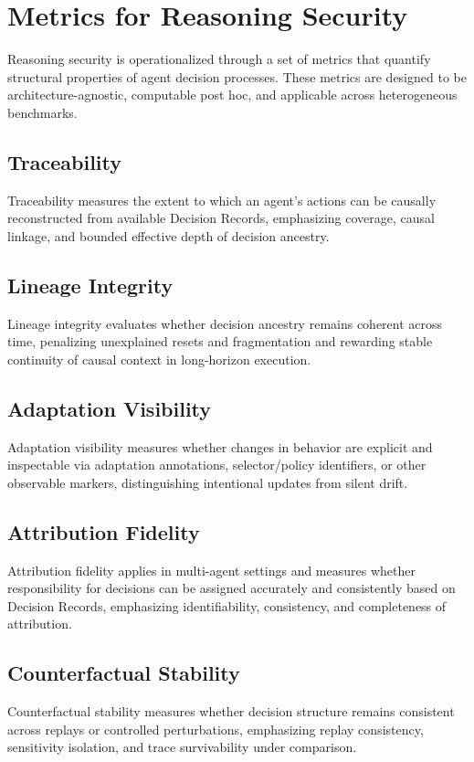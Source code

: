 \section{Metrics for Reasoning Security}
Reasoning security is operationalized through a set of metrics that quantify structural properties of agent decision processes. These metrics are designed to be architecture-agnostic, computable post hoc, and applicable across heterogeneous benchmarks.

\subsection{Traceability}
Traceability measures the extent to which an agent’s actions can be causally reconstructed from available Decision Records, emphasizing coverage, causal linkage, and bounded effective depth of decision ancestry.

\subsection{Lineage Integrity}
Lineage integrity evaluates whether decision ancestry remains coherent across time, penalizing unexplained resets and fragmentation and rewarding stable continuity of causal context in long-horizon execution.

\subsection{Adaptation Visibility}
Adaptation visibility measures whether changes in behavior are explicit and inspectable via adaptation annotations, selector/policy identifiers, or other observable markers, distinguishing intentional updates from silent drift.

\subsection{Attribution Fidelity}
Attribution fidelity applies in multi-agent settings and measures whether responsibility for decisions can be assigned accurately and consistently based on Decision Records, emphasizing identifiability, consistency, and completeness of attribution.

\subsection{Counterfactual Stability}
Counterfactual stability measures whether decision structure remains consistent across replays or controlled perturbations, emphasizing replay consistency, sensitivity isolation, and trace survivability under comparison.
